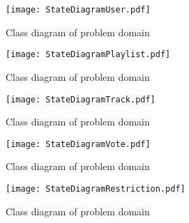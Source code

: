 \begin{figure}
  \centering
  \texttt{[image: StateDiagramUser.pdf]}
  \caption{Class diagram of problem domain}\label{fig:StateDiagramUser}
\end{figure}

\begin{figure}
  \centering
  \texttt{[image: StateDiagramPlaylist.pdf]}
  \caption{Class diagram of problem domain}\label{fig:StateDiagramPlaylist}
\end{figure}

\begin{figure}
  \centering
  \texttt{[image: StateDiagramTrack.pdf]}
  \caption{Class diagram of problem domain}\label{fig:StateDiagramTrack}
\end{figure}

\begin{figure}
  \centering
  \texttt{[image: StateDiagramVote.pdf]}
  \caption{Class diagram of problem domain}\label{fig:StateDiagramVote}
\end{figure}

\begin{figure}
  \centering
  \texttt{[image: StateDiagramRestriction.pdf]}
  \caption{Class diagram of problem domain}\label{fig:StateDiagramRestriction}
\end{figure}